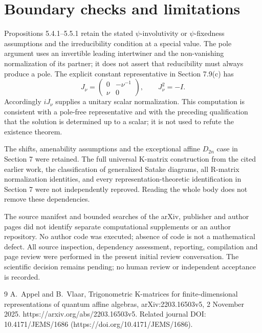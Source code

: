 \documentclass[10pt]{article}
\begin{document}
\section*{Boundary checks and limitations}
Propositions 5.4.1–5.5.1 retain the stated \(\psi\)-involutivity or \(\psi\)-fixedness assumptions and the irreducibility condition at a special value. The pole argument uses an invertible leading intertwiner and the non-vanishing normalization of its partner; it does not assert that reducibility must always produce a pole. The explicit constant representative in Section 7.9(c) has \[J_\nu=\begin{pmatrix}0&-\nu^{-1}\\ \nu&0\end{pmatrix},
 \qquad J_\nu^2=-I.\] Accordingly \(iJ_\nu\) supplies a unitary scalar normalization. This computation is consistent with a pole-free representative and with the preceding qualification that the solution is determined up to a scalar; it is not used to refute the existence theorem.\par
The shifts, amenability assumptions and the exceptional affine \(D_{2n}\) case in Section 7 were retained. The full universal K-matrix construction from the cited earlier work, the classification of generalized Satake diagrams, all R-matrix normalization identities, and every representation-theoretic identification in Section 7 were not independently reproved. Reading the whole body does not remove these dependencies.\par
The source manifest and bounded searches of the arXiv, publisher and author pages did not identify separate computational supplements or an author repository. No author code was executed; absence of code is not a mathematical defect. All source inspection, dependency assessment, reporting, compilation and page review were performed in the present initial review conversation. The scientific decision remains pending; no human review or independent acceptance is recorded.\par
9 A. Appel and B. Vlaar, Trigonometric K-matrices for finite-dimensional representations of quantum affine algebras, arXiv:2203.16503v5, 2 November 2025. https://arxiv.org/abs/2203.16503v5. Related journal DOI: 10.4171/JEMS/1686 (https://doi.org/10.4171/JEMS/1686).\par
\end{document}

